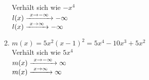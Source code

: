 \begin{Answer}[ref=ganzVerA1]
\begin{minipage}{\textwidth}
\begin{minipage}[t]{0.49\textwidth}
\begin{enumerate}[label=\alph*)]
				Verhält sich wie \(-x^4\)\\
				\(l(x)\xrightarrow{\hphantom{\ }x\to-\infty\hphantom{\ }}-\infty\)\\
				\(l(x)\xrightarrow{\hphantom{\ }x\to\infty\hphantom{\ }}-\infty\)
				\item \(m(x)=5x^2\left(x-1\right)^2=5x^4-10x^3+5x^2\)\\
				Verhält sich wie \(5x^4\)\\
				\(m(x)\xrightarrow{\hphantom{\ }x\to-\infty\hphantom{\ }}\infty\)\\
				\(m(x)\xrightarrow{\hphantom{\ }x\to\infty\hphantom{\ }}\infty\)
			\end{enumerate}
		\end{minipage}
	\end{minipage}
\end{Answer}